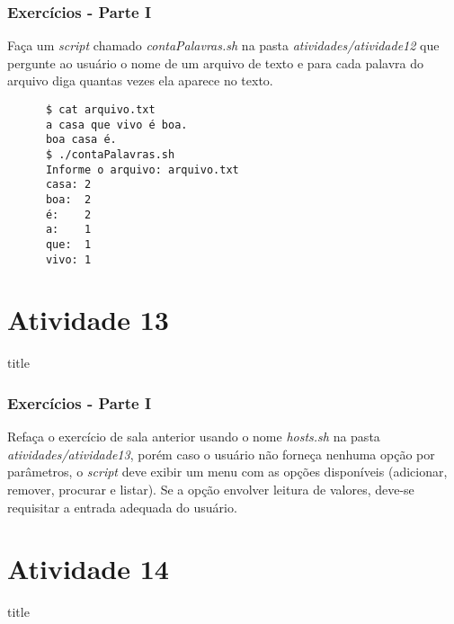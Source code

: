 \documentclass{beamer}
\begin{document}
   \begin{frame}[fragile]
      \frametitle{Exercícios - Parte I}
      Faça um \textit{script} chamado \textit{contaPalavras.sh} na pasta \textit{atividades/atividade12} que pergunte ao usuário o nome de um arquivo de texto e para cada palavra do arquivo diga quantas vezes ela aparece no texto. \\
      \begin{verbatim}
      $ cat arquivo.txt
      a casa que vivo é boa.
      boa casa é.
      $ ./contaPalavras.sh
      Informe o arquivo: arquivo.txt
      casa: 2
      boa:  2
      é:    2
      a:    1
      que:  1
      vivo: 1
      \end{verbatim}
\end{frame}

\section{Atividade 13}
    \begin{frame}
      \begin{beamercolorbox}[sep=8pt,center,shadow=true,rounded=true]{title}
      \insertsectionhead\par%
      \end{beamercolorbox}
   \end{frame}
 
   \begin{frame}
      \frametitle{Exercícios - Parte I}
      Refaça o exercício de sala anterior usando o nome \textit{hosts.sh} na pasta \textit{atividades/atividade13}, porém caso o usuário não forneça nenhuma opção por parâmetros, o \textit{script} deve exibir um menu com as opções disponíveis (adicionar, remover, procurar e listar). Se a opção envolver leitura de valores, deve-se requisitar a entrada adequada do usuário.
   \end{frame}

\section{Atividade 14}
    \begin{frame}
      \begin{beamercolorbox}[sep=8pt,center,shadow=true,rounded=true]{title}
      \insertsectionhead\par%
      \end{beamercolorbox}
   \end{frame}
 
\end{document}
